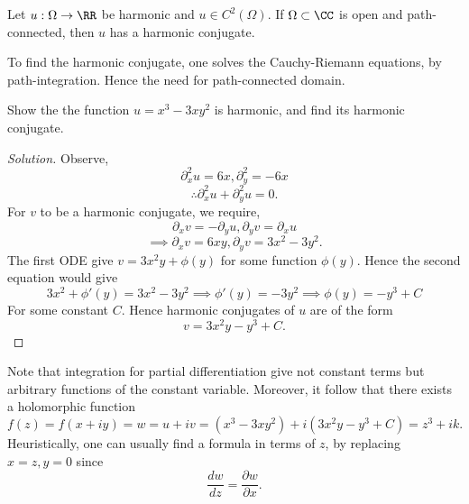 \begin{proposition}
  Let $u:\Omega\to\RR$ be harmonic and $u\in C^2(\Omega)$. If $\Omega\subset\CC$
  is open and path-connected, then $u$ has a harmonic conjugate.
  \label{<+label+>}
\end{proposition}
To find the harmonic conjugate, one solves the Cauchy-Riemann equations, by
path-integration. Hence the need for path-connected domain.
\begin{example}
  Show the the function $u=x^3-3xy^2$ is harmonic, and find its harmonic
  conjugate.
\end{example}
\begin{proof}[Solution]
  Observe,
  \[\partial_x^2 u = 6x, \partial_y^2 = -6x\]
  \[\therefore \partial_x^2 u + \partial_y^2 u= 0.\]
  For $v$ to be a harmonic conjugate, we require,
  \[\partial_x v = -\partial_y u, \partial_y v = \partial_x u\]
  \[\implies \partial_x v =  6xy, \partial_y v = 3x^2 - 3y^2.\]
  The first ODE give $v=3x^2y + \phi(y)$ for some function $\phi(y)$. Hence the
  second equation would give
  \[3x^2+\phi'(y) = 3x^2 - 3y^2 \implies \phi'(y)=-3y^2 \implies \phi(y)= -y^3
  +C\]
  For some constant $C$. Hence harmonic conjugates of $u$ are of the form
  \[v=3x^{2}y - y^3 +C.\]
\end{proof}
\begin{remark}
  Note that integration for partial differentiation give not constant terms but
  arbitrary functions of the constant variable. Moreover, it follow that there
  exists a holomorphic function
  \[f(z)=f(x+iy)=w=u+iv = (x^3-3xy^2) + i(3x^2y-y^3+C)= z^3+ik.\]
  Heuristically, one can usually find a formula in terms of $z$, by replacing
  $x=z, y=0$ since 
  \[\frac{dw}{dz}= \frac{\partial w}{\partial x}.\]
  \label{<+label+>}
\end{remark}
